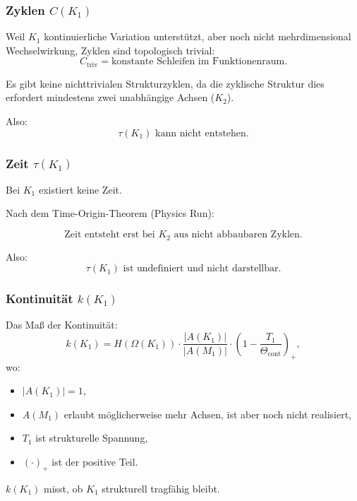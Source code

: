 \subsubsection{Zyklen \texorpdfstring{$C(K_1)$}{C(K_1)}}

Weil $K_1$ kontinuierliche Variation unterstützt, aber noch nicht mehrdimensional
Wechselwirkung, Zyklen sind topologisch trivial:
\[
C_{\mathrm{triv}} = \text{konstante Schleifen im Funktionenraum}.
\]

Es gibt keine nichttrivialen Strukturzyklen, da die zyklische Struktur dies erfordert
mindestens zwei unabhängige Achsen ($K_2$).

Also:
\[
\tau(K_1) \text{ kann nicht entstehen.}
\]

\subsubsection{Zeit \texorpdfstring{$\tau(K_1)$}{\tau(K_1)}}

Bei $K_1$ existiert keine Zeit.

Nach dem Time-Origin-Theorem (Physics Run):

\[
\text{Zeit entsteht erst bei } K_2 \text{ aus nicht abbaubaren Zyklen}.
\]

Also:
\[
\tau(K_1) \text{ ist undefiniert und nicht darstellbar.}
\]

\subsubsection{Kontinuität \texorpdfstring{$k(K_1)$}{k(K_1)}}

Das Maß der Kontinuität:
\[
k(K_1) =
H(\Omega(K_1)) \cdot
\frac{|A(K_1)|}{|A(M_1)|} \cdot
(1 - \frac{T_1}{\Theta_{\mathrm{cont}}})_+,
\]
wo:
\begin{itemize}
    \item $|A(K_1)| = 1$,
    \item $A(M_1)$ erlaubt möglicherweise mehr Achsen, ist aber noch nicht realisiert,
    \item $T_1$ ist strukturelle Spannung,
    \item $(\cdot)_+$ ist der positive Teil.
\end{itemize}

$k(K_1)$ misst, ob $K_1$ strukturell tragfähig bleibt.

